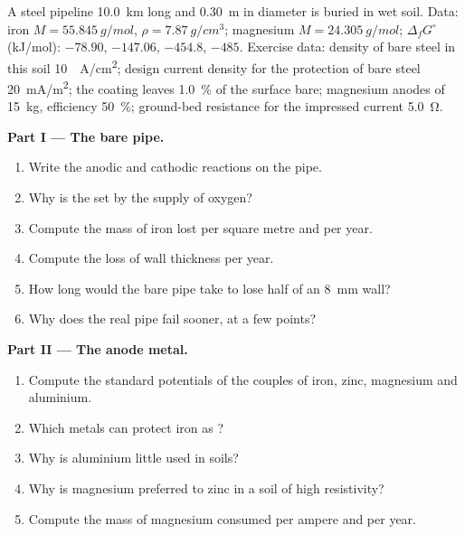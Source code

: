 \begin{problem}
\label{pb:b2:corrosion:1}
A steel pipeline \qty{10.0}{km} long and \qty{0.30}{m} in diameter is buried in
wet soil. Data: iron $M = \qty{55.845}{g/mol}$, $\rho = \qty{7.87}{g/cm^3}$;
magnesium $M = \qty{24.305}{g/mol}$; $\Delta_f G^\circ$ (\unit{kJ/mol}): 
$-78.90$,  $-147.06$,  $-454.8$,  $-485$. Exercise
data:  density of bare steel in this soil \qty{10}{\micro
A/cm^2}; design current density for the protection of bare steel
\qty{20}{mA/m^2}; the coating leaves 1.0~\% of the surface bare; magnesium anodes
of \qty{15}{kg}, efficiency 50~\%; ground-bed resistance for the impressed current
\qty{5.0}{\ohm}.

\medskip
\noindent\textbf{Part I --- The bare pipe.}
\begin{enumerate}
  \item Write the anodic and cathodic reactions on the pipe.
  \item Why is the  set by the supply of oxygen?
  \item Compute the mass of iron lost per square metre and per year.
  \item Compute the loss of wall thickness per year.
  \item How long would the bare pipe take to lose half of an \qty{8}{mm} wall?
  \item Why does the real pipe fail sooner, at a few points?
\end{enumerate}

\medskip
\noindent\textbf{Part II --- The anode metal.}
\begin{enumerate}[resume]
  \item Compute the standard potentials of the couples of iron, zinc, magnesium
        and aluminium.
  \item Which metals can protect iron as ?
  \item Why is aluminium little used in soils?
  \item Why is magnesium preferred to zinc in a soil of high resistivity?
  \item Compute the mass of magnesium consumed per ampere and per year.
\end{enumerate}


\end{problem}
